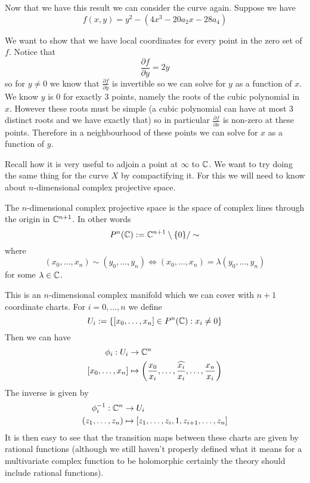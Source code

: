 Now that we have this result we can consider the curve again. Suppose we have 
$$f(x, y) = y^2 - (4x^3 - 20a_2 x - 28a_4)$$

We want to show that we have local coordinates for every point in the zero set of $f$.
Notice that 
$$\frac{\partial f}{\partial y} = 2y$$
so for $y \neq 0$ we know that $\frac{\partial f}{\partial y}$ is invertible so we can solve for $y$ as a function of $x$. We know $y$ is 0 for exactly 3 points, namely the roots of the cubic polynomial in $x$. However these roots must be simple (a cubic polynomial can have at most 3 distinct roots and we have exactly that) so in particular $\frac{\partial f}{\partial x}$ is non-zero at these points. Therefore in a neighbourhood of these points we can solve for $x$ as a function of $y$.

Recall how it is very useful to adjoin a point at $\infty$ to $\mathbb{C}$. We want to try doing the same thing for the curve $X$ by compactifying it. For this we will need to know about $n$-dimensional complex projective space.

The $n$-dimensional complex projective space is the space of complex lines through the origin in $\mathbb{C}^{n + 1}$. In other words
$$P^n(\mathbb{C}) := \mathbb{C}^{n + 1} \setminus \{0\}/\sim$$
where
$$(x_0, \dots, x_n) \sim (y_0, \dots, y_n) \Leftrightarrow (x_0, \dots, x_n) = \lambda(y_0, \dots, y_n)$$
for some $\lambda \in \mathbb{C}$.

This is an $n$-dimensional complex manifold which we can cover with $n + 1$ coordinate charts. For $i = 0, \dots, n$ we define 
$$U_i := \{[x_0, \dots, x_n] \in P^n(\mathbb{C}) : x_i \neq 0\}$$
Then we can have 
\begin{align*}
    \phi_i: U_i &\to \mathbb{C}^n\\
    [x_0, \dots, x_n] &\mapsto \left( \frac{x_0}{x_i}, \dots, \widehat{\frac{x_i}{x_i}}, \dots, \frac{x_n}{x_i} \right)
\end{align*}
The inverse is given by
\begin{align*}
    \phi_i^{-1}: \mathbb{C}^n &\to U_i\\
    (z_1, \dots, z_n) &\mapsto [z_1, \dots, z_{i}, 1, z_{i + 1}, \dots, z_n]
\end{align*}
It is then easy to see that the transition maps between these charts are given by rational functions (although we still haven't properly defined what it means for a multivariate complex function to be holomorphic certainly the theory should include rational functions). 

